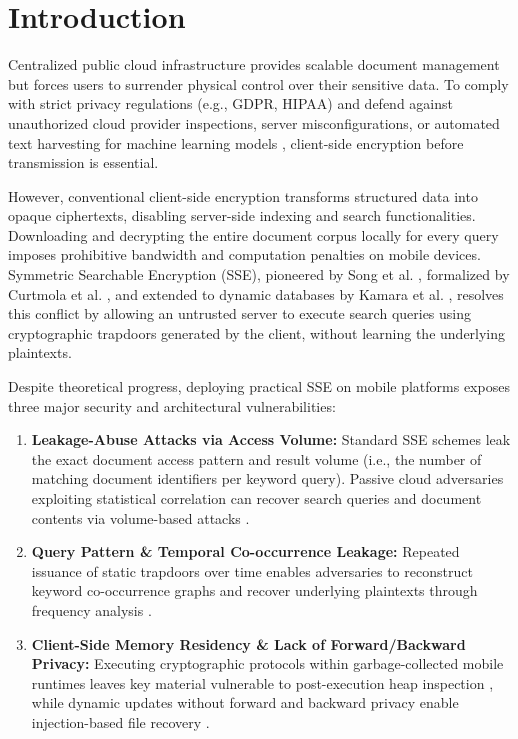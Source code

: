 \documentclass[runningheads]{llncs}
\begin{document}
\section{Introduction}
Centralized public cloud infrastructure provides scalable document management but forces users to surrender physical control over their sensitive data. To comply with strict privacy regulations (e.g., GDPR, HIPAA) and defend against unauthorized cloud provider inspections, server misconfigurations, or automated text harvesting for machine learning models \cite{shokri2015,carlini2021}, client-side encryption before transmission is essential. 

However, conventional client-side encryption transforms structured data into opaque ciphertexts, disabling server-side indexing and search functionalities. Downloading and decrypting the entire document corpus locally for every query imposes prohibitive bandwidth and computation penalties on mobile devices. Symmetric Searchable Encryption (SSE), pioneered by Song et al. \cite{song2000}, formalized by Curtmola et al. \cite{curtmola2006}, and extended to dynamic databases by Kamara et al. \cite{kamara2012}, resolves this conflict by allowing an untrusted server to execute search queries using cryptographic trapdoors generated by the client, without learning the underlying plaintexts.

Despite theoretical progress, deploying practical SSE on mobile platforms exposes three major security and architectural vulnerabilities:
\begin{enumerate}
    \item \textbf{Leakage-Abuse Attacks via Access Volume:} Standard SSE schemes leak the exact document access pattern and result volume (i.e., the number of matching document identifiers per keyword query). Passive cloud adversaries exploiting statistical correlation can recover search queries and document contents via volume-based attacks \cite{cash2013,kellaris2016}.
    \item \textbf{Query Pattern \& Temporal Co-occurrence Leakage:} Repeated issuance of static trapdoors over time enables adversaries to reconstruct keyword co-occurrence graphs and recover underlying plaintexts through frequency analysis \cite{swat2024}.
    \item \textbf{Client-Side Memory Residency \& Lack of Forward/Backward Privacy:} Executing cryptographic protocols within garbage-collected mobile runtimes leaves key material vulnerable to post-execution heap inspection \cite{kocher1996}, while dynamic updates without forward and backward privacy enable injection-based file recovery \cite{pets2023_dynamic_vh,sgxse2_2020}.
\end{enumerate}
\end{document}
